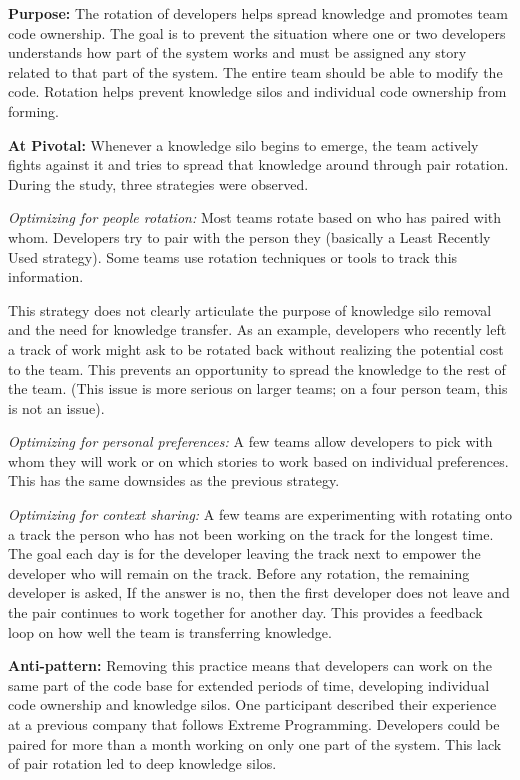 \textbf{Purpose:} The rotation of developers helps spread knowledge and promotes team code ownership. The goal is to prevent the situation where one or two developers understands how  part of the system works and must be assigned any story related to that part of the system. The entire team should be able to modify the code. Rotation helps prevent knowledge silos and individual code ownership from forming. 

\textbf{At Pivotal:} Whenever a knowledge silo begins to emerge, the team actively fights against it and tries to spread that knowledge around through pair rotation. During the study, three strategies were observed.

\textit{Optimizing for people rotation:} Most teams rotate based on who has paired with whom. Developers try to pair with the person they  (basically a Least Recently Used strategy). Some teams use rotation techniques or tools to track this information.

This strategy does not clearly articulate the purpose of knowledge silo removal and the need for knowledge transfer. As an example, developers who recently left a track of work might ask to be rotated back without realizing the potential cost to the team. This prevents an opportunity to spread the knowledge to the rest of the team. (This issue is more serious on larger teams; on a four person team, this is not an issue).

\textit{Optimizing for personal preferences:} A few teams allow developers to pick with whom they will work or on which stories to work based on individual preferences. This has the same downsides as the previous strategy. 

\textit{Optimizing for context sharing:} A few teams are experimenting with rotating onto a track the person who has not been working on the track for the longest time. The goal each day is for the developer leaving the track next to empower the developer who will remain on the track. Before any rotation, the remaining developer is asked,  If the answer is no, then the first developer does not leave and the pair continues to work together for another day. This provides a feedback loop on how well the team is transferring knowledge. 

\textbf{Anti-pattern:} Removing this practice means that developers can work on the same part of the code base for extended periods of time, developing individual code ownership and knowledge silos. One participant described their experience at a previous company that follows Extreme Programming. Developers could be paired for more than a month working on only one part of the system. This lack of pair rotation led to deep knowledge silos. 

